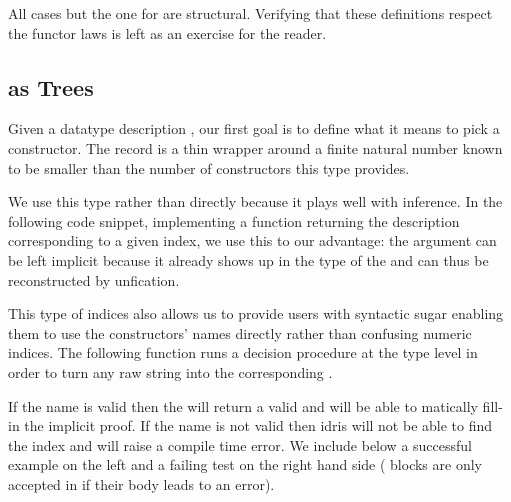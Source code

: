 All cases but the one for  are structural.
%
Verifying that these definitions respect the functor laws is left as
an exercise for the reader.

\subsection{ as Trees}

Given a datatype description , our first goal is
to define what it means to pick a constructor.
%
The  record is a thin wrapper around a finite
natural number known to be smaller than the number of constructors
this type provides.


We use this type rather than  directly because it
plays well with inference.
%
In the following code snippet, implementing a function returning
the description corresponding to a given index,
we use this to our advantage:
the  argument can be left implicit because it already
shows up in the type of the  and can thus be
reconstructed by unfication.


This type of indices also allows us to provide users with
syntactic sugar enabling them to use the constructors' names
directly rather than confusing numeric indices.
%
The following function runs a decision procedure
 at the type level
in order to turn any raw string 
into the corresponding .


If the name is valid then the  will
return a valid  and \idris{} will be able to
matically fill-in the implicit proof.
%
If the name is not valid then idris will not be able to
find the index and will raise a compile time error.
%
We include below a successful example on the left and a failing test
on the right hand side ( blocks are only
accepted in \idris{} if their body leads to an error).

\begin{minipage}[t]{0.3\textwidth}
\end{minipage}\hfill
\begin{minipage}[t]{0.5\textwidth}
\end{minipage}

